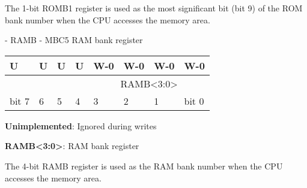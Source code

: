 The 1-bit ROMB1 register is used as the most significant bit (bit 9) of the ROM
bank number when the CPU accesses the  memory area.

\begin{register}[H]
  \caption{ - RAMB - MBC5 RAM bank register}

  {
    \ttfamily
    \begin{tabularx}{\textwidth}{|X|X|X|X|X|X|X|X|}
      \hline
      U & U & U & U & W-0 & W-0 & W-0 & W-0 \\
      \hline
      \cellcolor{LightGray} & \cellcolor{LightGray} & \cellcolor{LightGray} & \cellcolor{LightGray} & \multicolumn{4}{c|}{RAMB<3:0>} \\
      \hline
      bit 7 & 6 & 5 & 4 & 3 & 2 & 1 & bit 0 \\
      \hline
    \end{tabularx}
  }

  \begin{description}[leftmargin=5em, style=nextline]
    \item[bit 7-4]
      \textbf{Unimplemented}: Ignored during writes
    \item[bit 3-0]
      \textbf{RAMB<3:0>}: RAM bank register \\
  \end{description}
\end{register}

The 4-bit RAMB register is used as the RAM bank number when the CPU accesses
the  memory area.
